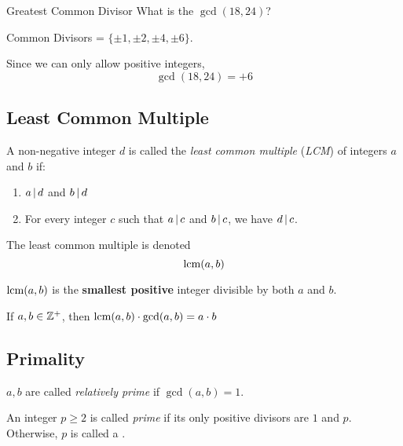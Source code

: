 \begin{example}[]{Greatest Common Divisor}
  What is the $\gcd(18, 24)$?

  \tcblower{}

  Common Divisors = $\lbrace \pm 1, \pm 2, \pm 4, \pm 6 \rbrace$.

  Since we can only allow positive integers,
  \begin{equation*}
    \gcd(18, 24) = +6
  \end{equation*}
\end{example}

\subsection{Least Common Multiple}\label{subsec:Least_Common_Multiple}
\begin{definition}\label{def:LCM}
  A non-negative integer $d$ is called the \emph{least common multiple} (\emph{LCM}) of integers $a$ and $b$ if:
  \begin{enumerate}[noitemsep]
  \item $a \operatorname{\vert} d$ and $b \operatorname{\vert} d$
  \item For every integer $c$ such that $a \operatorname{\vert} c$ and $b \operatorname{\vert} c$, we have $d \operatorname{\vert} c$.
  \end{enumerate}

  The least common multiple is denoted
  \begin{equation}\label{eq:LCM}
    \operatorname{\text{lcm}}(a, b)
  \end{equation}

  $\operatorname{\text{lcm}}(a, b)$ is the \textbf{smallest positive} integer divisible by both $a$ and $b$.

  \begin{remark}
    If $a, b \in \operatorname{\mathbb{Z}^{+}}$, then $\operatorname{\text{lcm}}(a, b) \cdot \gcd(a, b) = a \cdot b$
  \end{remark}
\end{definition}

\subsection{Primality}\label{subsec:Primality}
\begin{definition}\label{def:Relatively_Prime}
  $a, b$ are called \emph{relatively prime} if $\gcd(a, b) = 1$.
\end{definition}

\begin{definition}[Prime]\label{def:Prime}
  An integer $p \geq 2$ is called \emph{prime} if its only positive divisors are $1$ and $p$.
  Otherwise, $p$ is called a \emph{}.
\end{definition}

